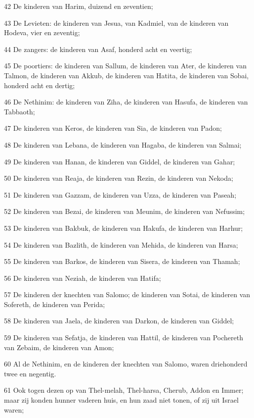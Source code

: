 \par 42 De kinderen van Harim, duizend en zeventien;
\par 43 De Levieten: de kinderen van Jesua, van Kadmiel, van de kinderen van Hodeva, vier en zeventig;
\par 44 De zangers: de kinderen van Asaf, honderd acht en veertig;
\par 45 De poortiers: de kinderen van Sallum, de kinderen van Ater, de kinderen van Talmon, de kinderen van Akkub, de kinderen van Hatita, de kinderen van Sobai, honderd acht en dertig;
\par 46 De Nethinim: de kinderen van Ziha, de kinderen van Hasufa, de kinderen van Tabbaoth;
\par 47 De kinderen van Keros, de kinderen van Sia, de kinderen van Padon;
\par 48 De kinderen van Lebana, de kinderen van Hagaba, de kinderen van Salmai;
\par 49 De kinderen van Hanan, de kinderen van Giddel, de kinderen van Gahar;
\par 50 De kinderen van Reaja, de kinderen van Rezin, de kinderen van Nekoda;
\par 51 De kinderen van Gazzam, de kinderen van Uzza, de kinderen van Paseah;
\par 52 De kinderen van Bezai, de kinderen van Meunim, de kinderen van Nefussim;
\par 53 De kinderen van Bakbuk, de kinderen van Hakufa, de kinderen van Harhur;
\par 54 De kinderen van Bazlith, de kinderen van Mehida, de kinderen van Harsa;
\par 55 De kinderen van Barkos, de kinderen van Sisera, de kinderen van Thamah;
\par 56 De kinderen van Neziah, de kinderen van Hatifa;
\par 57 De kinderen der knechten van Salomo; de kinderen van Sotai, de kinderen van Sofereth, de kinderen van Perida;
\par 58 De kinderen van Jaela, de kinderen van Darkon, de kinderen van Giddel;
\par 59 De kinderen van Sefatja, de kinderen van Hattil, de kinderen van Pochereth van Zebaim, de kinderen van Amon;
\par 60 Al de Nethinim, en de kinderen der knechten van Salomo, waren driehonderd twee en negentig.
\par 61 Ook togen dezen op van Thel-melah, Thel-harsa, Cherub, Addon en Immer; maar zij konden hunner vaderen huis, en hun zaad niet tonen, of zij uit Israel waren;
